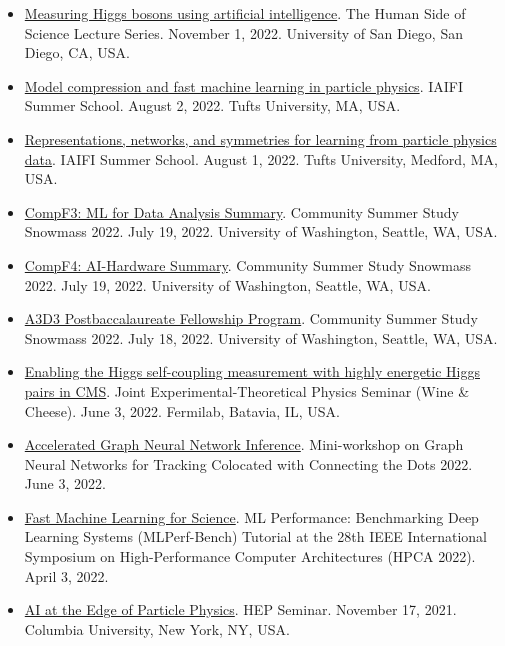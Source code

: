 \documentclass[11pt]{res}
\begin{document}
\begin{resume}
\begin{itemize}
    \item \href{https://www.sandiego.edu/events/cas/detail.php?_focus=86860}{Measuring Higgs bosons using artificial intelligence}. The Human Side of Science Lecture Series. November 1, 2022. University of San Diego, San Diego, CA, USA.
    \item \href{https://iaifi.org/summer-school-agenda}{Model compression and fast machine learning in particle physics}. IAIFI Summer School. August 2, 2022. Tufts University, MA, USA.
    \item \href{https://iaifi.org/summer-school-agenda}{Representations, networks, and symmetries for learning from particle physics data}. IAIFI Summer School. August 1, 2022. Tufts University, Medford, MA, USA.
    \item \href{https://indico.fnal.gov/event/22303/contributions/245447}{CompF3: ML for Data Analysis Summary}. Community Summer Study Snowmass 2022. July 19, 2022. University of Washington, Seattle, WA, USA.
    \item \href{https://indico.fnal.gov/event/22303/contributions/245914}{CompF4: AI-Hardware Summary}. Community Summer Study Snowmass 2022. July 19, 2022. University of Washington, Seattle, WA, USA.
    \item \href{https://indico.fnal.gov/event/22303/contributions/244766}{A3D3 Postbaccalaureate Fellowship Program}. Community Summer Study Snowmass 2022. July 18, 2022. University of Washington, Seattle, WA, USA.
    \item \href{https://indico.fnal.gov/event/55499/}{Enabling the Higgs self-coupling measurement with highly energetic Higgs pairs in CMS}. Joint Experimental-Theoretical Physics Seminar (Wine \& Cheese). June 3, 2022. Fermilab, Batavia, IL, USA.
    \item \href{https://indico.cern.ch/event/1128328/contributions/4900731/}{Accelerated Graph Neural Network Inference}. Mini-workshop on Graph Neural Networks for Tracking Colocated with Connecting the Dots 2022. June 3, 2022.
    \item \href{https://sites.google.com/g.harvard.edu/mlperf-bench-hpca22/home}{Fast Machine Learning for Science}. ML Performance: Benchmarking Deep Learning Systems (MLPerf-Bench) Tutorial at the 28th IEEE International Symposium on High-Performance Computer Architectures (HPCA 2022). April 3, 2022.
    \item \href{https://physics.columbia.edu/events/hep-seminar-dr-javier-duarte-ucsd}{AI at the Edge of Particle Physics}. HEP Seminar. November 17, 2021. Columbia University, New York, NY, USA.

\end{itemize}
\end{resume}
\end{document}
